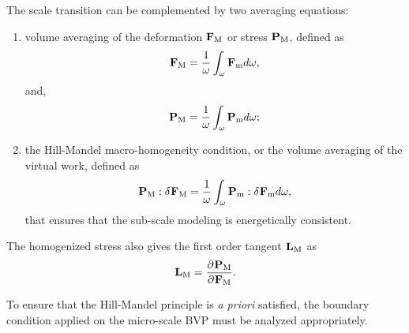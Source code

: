 The scale transition can be complemented by two averaging equations:
\begin{enumerate}
	\item volume averaging of the deformation $\textbf F_\text M$ or stress $\textbf P_\text M$, defined as
	\begin{equation}\label{eq-st-1}
	\tgm[]{F}=\frac{1}{\omega}\int_\omega\tgmm[]{F}d\omega,
	\end{equation}
	and,
	\begin{equation}\label{eq-st-2}
	\tgm[]{P}=\frac{1}{\omega}\int_\omega\tgmm[]{P}d\omega;
	\end{equation}
	\item the Hill-Mandel macro-homogeneity condition, or the volume averaging of the virtual work, defined as
	\begin{equation}\label{eq-st-3}
	\tgm[]{P}:\delta\tgm[]{F}
	=\frac{1}{\omega}\int_\omega\tgmm[]{P}:\delta\tgmm[]{F}d\omega,
	\end{equation}
	that ensures that the sub-scale modeling is energetically consistent.
\end{enumerate}

The homogenized stress also gives the first order tangent $ \tgm[]{L} $
as
\begin{eqnarray}\label{eq-st-4}
\tgm[]{L}=\frac{\partial\tgm[]{P}}{\partial\tgm[]{F}}. 
\end{eqnarray}

To ensure that the Hill-Mandel principle is \textit{a priori} satisfied, the boundary condition applied on the micro-scale BVP must be analyzed appropriately.

